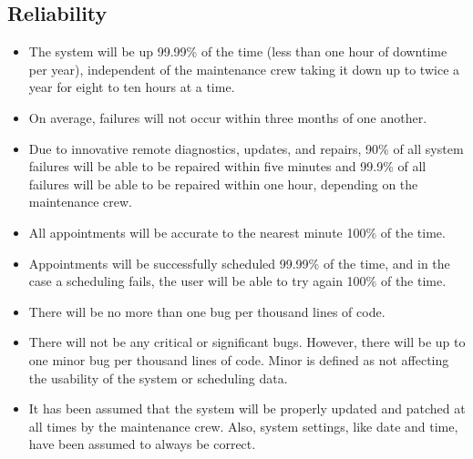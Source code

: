 \subsection{Reliability}
\begin{itemize}
\item The system will be up 99.99\% of the time (less than one hour of downtime per year), independent of the maintenance crew taking it down up to twice a year for eight to ten hours at a time.
\item On average, failures will not occur within three months of one another.
\item Due to innovative remote diagnostics, updates, and repairs, 90\% of all system failures will be able to be repaired within five minutes and 99.9\% of all failures will be able to be repaired within one hour, depending on the maintenance crew.
\item All appointments will be accurate to the nearest minute 100\% of the time.
\item Appointments will be successfully scheduled 99.99\% of the time, and in the case a scheduling fails, the user will be able to try again 100\% of the time.
\item There will be no more than one bug per thousand lines of code.
\item There will not be any critical or significant bugs. However, there will be up to one minor bug per thousand lines of code. Minor is defined as not affecting the usability of the system or scheduling data.
\item It has been assumed that the system will be properly updated and patched at all times by the maintenance crew. Also, system settings, like date and time, have been assumed to always be correct.
\end{itemize}
